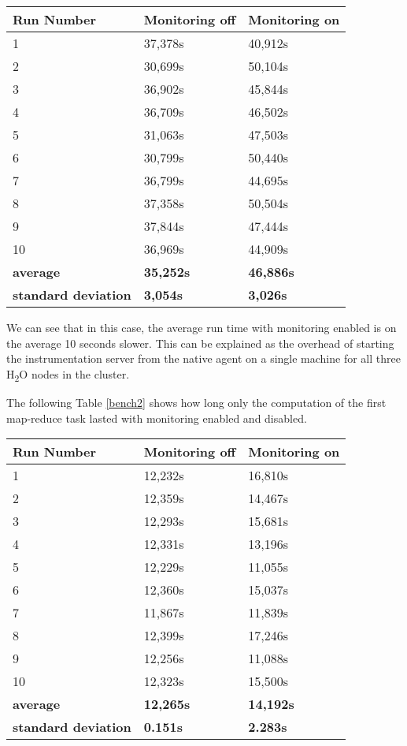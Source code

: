 \begin{center}
	\begin{tabular}{ l l l }
		\hline
		Run Number & Monitoring off & Monitoring on \\ \hline
1 & 37,378s	& 40,912s	\\
2 & 30,699s & 50,104s	\\
3 & 36,902s & 45,844s	\\
4 & 36,709s	& 46,502s	\\
5 & 31,063s	& 47,503s	\\
6 & 30,799s &	50,440s	\\
7 & 36,799s &	44,695s	\\
8 & 37,358s	& 50,504s	\\
9 & 37,844s	& 47,444s	\\
10 & 36,969s	& 44,909s	\\
  \hline  
\textbf{average} & \textbf{35,252s} & \textbf{46,886s} \\
\textbf{standard deviation} & \textbf{3,054s} & \textbf{3,026s} \\
	\end{tabular}
	\label{bench1}
\end{center}
We can see that in this case, the average run time with monitoring enabled is on the average 10 seconds slower. This can be explained as the overhead of starting the instrumentation server from the native agent on a single machine for all three H\textsubscript{2}O nodes in the cluster.

The following Table \ref{bench2} shows how long only the computation of the first map-reduce task lasted with monitoring enabled and disabled.

\begin{center}
	\begin{tabular}{ l l l }
		\hline
		Run Number & Monitoring off & Monitoring on \\ \hline
1	&12,232s&	16,810s  \\ 
2 	&12,359s &	14,467s \\ 
3	&12,293s &	15,681s \\ 
4	&12,331s &	13,196s \\ 
5	&12,229s &	11,055s \\ 
6	&12,360s &	15,037s \\ 
7 &	11,867s	&11,839s  \\ 
8	 &	12,399s &17,246s  \\ 
9&	12,256s 	&11,088s  \\ 
10	&12,323s &	15,500s \\ 

		\hline  
		\textbf{average} & \textbf{12,265s} & \textbf{14,192s} \\
		\textbf{standard deviation} & \textbf{0.151s} & \textbf{2.283s} \\
	\end{tabular}
	\label{bench2}
\end{center}

